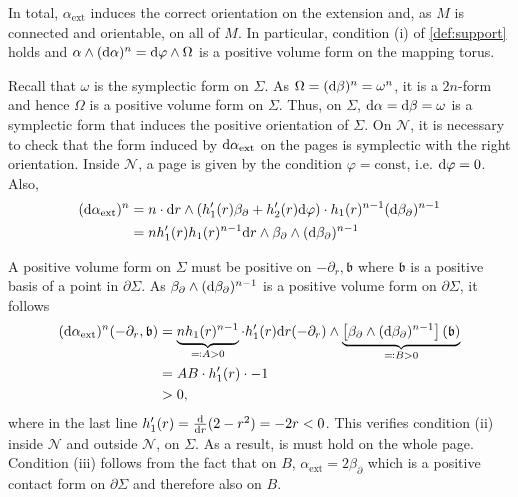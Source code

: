 In total, $\alpha_\text{ext}$ induces the correct orientation on the extension and,
as $M$ is connected and orientable, on all of $M$.
In particular, condition (i) of \cref{def:support} holds and $\alpha \wedge (\mathrm{d} \alpha)^n = \mathrm{d} \varphi \wedge \Omega$ is a positive volume form on the mapping torus. 

Recall that $\omega$ is the symplectic form on $\Sigma$.
As $\Omega = (\mathrm{d} \beta)^n = \omega^n$, it is a $2n$-form and hence $\Omega$ is a positive volume form on $\Sigma$. 
Thus, on $\Sigma$, $\mathrm{d} \alpha = \mathrm{d} \beta = \omega$ is a symplectic form that induces the positive orientation of $\Sigma$. 
On $\mathcal{N}$, it is necessary to check that the form induced by $\mathrm{d} \alpha_\text{ext}$ on the pages is symplectic with the right orientation.
Inside $\mathcal{N}$, a page is given by the condition $\varphi = \mathrm{const}$, i.e. $\mathrm{d} \varphi = 0$.
Also,
\begin{align*}
    (\mathrm{d} \alpha_\text{ext})^n &= n\cdot \mathrm{d} r\wedge (h_1'(r) \beta_\partial + h_2'(r) \mathrm{d}\varphi) \cdot h_1(r)^{n-1}(\mathrm{d} \beta_\partial)^{n-1}\\
    &= n h_1'(r)h_1(r)^{n-1} \mathrm{d} r \wedge \beta_\partial \wedge (\mathrm{d} \beta_\partial)^{n-1}
\end{align*}

A positive volume form on $\Sigma$ must be positive on $- \partial_r, \mathfrak{b}$ where $\mathfrak{b}$ is a positive basis of a point in $\partial \Sigma$.
As $\beta_\partial \wedge (\mathrm{d} \beta_\partial)^{n-1}$ is a positive volume form on $\partial \Sigma$, it follows
\begin{align*}
    (\mathrm{d} \alpha_\text{ext})^n(- \partial_r, \mathfrak{b}) &= \underbrace{n h_1(r)^{n-1}}_{\eqqcolon A > 0} \cdot h_1'(r) \mathrm{d} r(-\partial_r) \wedge \underbrace{\left[\beta_\partial \wedge (\mathrm{d} \beta_\partial)^{n-1}\right](\mathfrak{b})}_{\eqqcolon B > 0}\\
    &= AB \cdot h_1'(r) \cdot -1\\
    &> 0,
\end{align*}
where in the last line $h_1'(r) = \frac{\mathrm{d}}{\mathrm{d} r}(2 - r^2) = -2r < 0$.
This verifies condition (ii) inside $\mathcal{N}$ and outside $\mathcal{N}$, on $\Sigma$. As a result, is must hold on the whole page.
Condition (iii) follows from the fact that on $B$, $\alpha_\text{ext} = 2 \beta_\partial$ which is a positive contact form on $\partial \Sigma$ and therefore also on $B$.